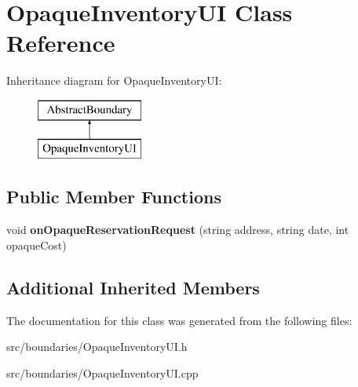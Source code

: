 \hypertarget{class_opaque_inventory_u_i}{}\section{Opaque\+Inventory\+UI Class Reference}
\label{class_opaque_inventory_u_i}
Inheritance diagram for Opaque\+Inventory\+UI\+:\begin{figure}[H]
\begin{center}
\leavevmode
\includegraphics[height=2.000000cm]{class_opaque_inventory_u_i}
\end{center}
\end{figure}
\subsection*{Public Member Functions}
\begin{DoxyCompactItemize}
\item 
\mbox{\label{class_opaque_inventory_u_i_afa5550666cb6f3616f6a23e738e049c8}} 
void {\bfseries on\+Opaque\+Reservation\+Request} (string address, string date, int opaque\+Cost)
\end{DoxyCompactItemize}
\subsection*{Additional Inherited Members}


The documentation for this class was generated from the following files\+:\begin{DoxyCompactItemize}
\item 
src/boundaries/Opaque\+Inventory\+U\+I.\+h\item 
src/boundaries/Opaque\+Inventory\+U\+I.\+cpp\end{DoxyCompactItemize}

